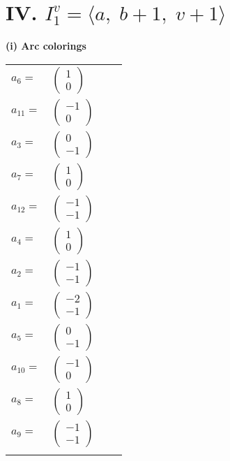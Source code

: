 \documentclass[1p]{elsarticle_modified}
\theoremstyle{definition}
\begin{document}
\centering \section*{IV. $I^v_{1}= \langle a,\;b+1,\;v+1 \rangle$}
\flushleft \textbf{(i) Arc colorings}\\
\begin{tabular}{m{7pt} m{180pt} m{7pt} m{180pt} }
\flushright $a_{6}=$&$\begin{pmatrix}1\\0\end{pmatrix}$ \\
\flushright $a_{11}=$&$\begin{pmatrix}-1\\0\end{pmatrix}$ \\
\flushright $a_{3}=$&$\begin{pmatrix}0\\-1\end{pmatrix}$ \\
\flushright $a_{7}=$&$\begin{pmatrix}1\\0\end{pmatrix}$ \\
\flushright $a_{12}=$&$\begin{pmatrix}-1\\-1\end{pmatrix}$ \\
\flushright $a_{4}=$&$\begin{pmatrix}1\\0\end{pmatrix}$ \\
\flushright $a_{2}=$&$\begin{pmatrix}-1\\-1\end{pmatrix}$ \\
\flushright $a_{1}=$&$\begin{pmatrix}-2\\-1\end{pmatrix}$ \\
\flushright $a_{5}=$&$\begin{pmatrix}0\\-1\end{pmatrix}$ \\
\flushright $a_{10}=$&$\begin{pmatrix}-1\\0\end{pmatrix}$ \\
\flushright $a_{8}=$&$\begin{pmatrix}1\\0\end{pmatrix}$ \\
\flushright $a_{9}=$&$\begin{pmatrix}-1\\-1\end{pmatrix}$\\&\end{tabular}
\end{document}
